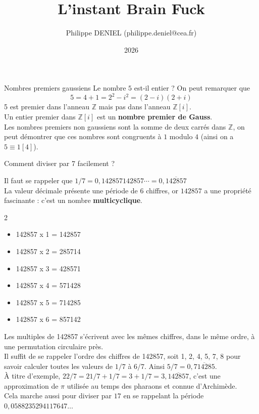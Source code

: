\documentclass[aspectratio=1610,10pt,dvipsnames]{beamer}
\title{L'instant Brain Fuck}
\date{2026}
\institute{CEA}
\author{Philippe DENIEL (philippe.deniel@cea.fr)}
\begin{document}
\frame{\titlepage}

\begin{frame}{Nombres premiers gaussiens}
Le nombre $5$ est-il entier ? On peut remarquer que 
\begin{equation*}
    5 = 4 + 1 = 2^2-i^2 = (2-i)(2+i)
\end{equation*}
5 est premier dans l'anneau $\mathbb{Z}$ mais pas dans l'anneau $\mathbb{Z}[i]$.
\\[0.5em]
Un entier premier dans $\mathbb{Z}[i]$ est un \textbf{nombre premier de Gauss}. 
\\[0.5em]
Les nombres premiers non gaussiens sont la somme de deux carrés dans $\mathbb{Z}$, on peut démontrer 
que ces nombres sont congruents à $1$ modulo $4$ (ainsi on a $5 \equiv 1 [4]$).
\end{frame}

\begin{frame}{Comment diviser par 7 facilement ?}

Il faut se rappeler que $1/7 = 0,142857142857\cdots = 0,\overline{142857}$
\\[0.3em]
La valeur décimale présente une période de 6 chiffres, or $142857$ a une propriété fascinante : c'est 
un nombre \textbf{multicyclique}.
\begin{multicols}{2}
\begin{itemize}
    \item 142857 x 1 = 142857
    \item 142857 x 2 = 285714
    \item 142857 x 3 = 428571
    \columnbreak
    \item 142857 x 4 = 571428
    \item 142857 x 5 = 714285
    \item 142857 x 6 = 857142
\end{itemize}
\end{multicols}
Les multiples de 142857 s'écrivent avec les mêmes chiffres, dans le même ordre, à une permutation circulaire
près. 
\\[0.2em]
Il suffit de se rappeler l'ordre des chiffres de 142857, soit 1, 2, 4, 5, 7, 8 pour savoir calculer toutes les
valeurs de $1/7$ à $6/7$. Ainsi $5/7 = 0,\overline{714285}$.
\\[0.2em]
À titre d'exemple, $22/7 = 21/7 + 1/7 = 3 + 1/7 = 3,\overline{142857}$, c'est une approximation de $\pi$
utilisée au temps des pharaons et connue d'Archimède. 
\\[0.2em]
Cela marche aussi pour diviser par $17$ en se rappelant la période $0,0588235294117647\dots$
\end{frame}
\end{document}
